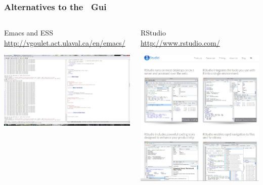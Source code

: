 \documentclass[color=usenames,dvipsnames]{beamer}\usepackage[]{graphicx}\usepackage[]{color}
\begin{document}
\begin{frame}
  \frametitle{Alternatives to the \R~Gui}
  \begin{columns}
    \small
    \begin{column}{0.6\textwidth}
      \centering
      Emacs and ESS \\ \tiny
      \url{http://vgoulet.act.ulaval.ca/en/emacs/} \par
      \includegraphics[width=\textwidth]{figs/emacs}
    \end{column}
    \begin{column}{0.4\textwidth}
      \centering
      RStudio \\
      \url{http://www.rstudio.com/} \par
      \includegraphics[width=\textwidth]{figs/Rstudio}

\end{column}
\end{columns}
\end{frame}
\end{document}
